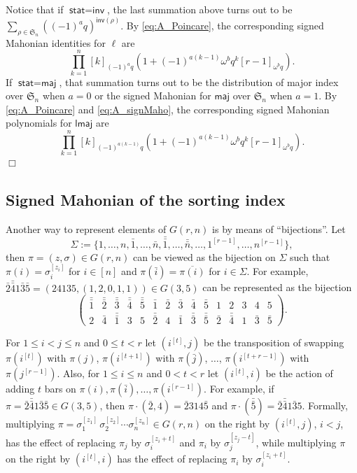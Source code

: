 \documentclass[a4paper, reqno, 11pt]{amsart}
\newcommand{\stat}{{\textsf{stat}}}
\newcommand{\maj}{{\textsf{maj}}}
\newcommand{\inv}{{\textsf{inv}}}
\newcommand{\lmaj}{{\textsf{lmaj}}}
\numberwithin{equation}{section}
\renewcommand{\d}{\displaystyle}
\def\qed{\hspace*{\fill} $\Box$ \medskip}
\begin{document}
Notice that if $\stat=\inv$, the last summation above turns out to be 
$\d\sum_{\rho\in \mathfrak{S}_n}\left((-1)^{a}q\right)^{\inv(\rho)}$. 
By \eqref{eq:A_Poincare}, the corresponding signed Mahonian identities for $\ell$ are
$$\prod_{k=1}^n[k]_{(-1)^aq}\left(1+(-1)^{a(k-1)}\omega^bq^k[r-1]_{\omega^bq}\right).$$
If $\stat=\maj$, that summation turns out to be the distribution of major index over $\mathfrak{S}_n$ when $a=0$ or the signed Mahonian for $\maj$ over $\mathfrak{S}_n$ when $a=1$. 
By \eqref{eq:A_Poincare} and \eqref{eq:A_signMaho}, the corresponding signed Mahonian polynomials for $\lmaj$ are
$$\prod_{k=1}^n[k]_{(-1)^{a(k-1)}q} \left(1+(-1)^{a(k-1)}\omega^bq^k[r-1]_{\omega^bq}\right).$$  \qed











\subsection{Signed Mahonian of the sorting index}\label{sec:Grn_sor}

Another way to represent elements of $G(r,n)$ is by means of ``bijections''.
Let $$\Sigma:=\{1,\ldots,n,\bar{1},\ldots,\bar{n},\bar{\bar{1}},\ldots,\bar{\bar{n}},\ldots,1^{[r-1]},\ldots,n^{[r-1]} \},$$ then $\pi=(z,\sigma)\in G(r,n)$ can be viewed as the bijection on $\Sigma$ such that $\pi(i)=\sigma_i^{[z_i]}$ for $i\in [n]$ and $\pi(\bar{i})=\overline{\pi(i)}$ for $i\in\Sigma$.
For example, $\bar{2}\bar{\bar{4}}1\bar{3}\bar{5}=(24135,(1,2,0,1,1))\in G(3,5)$ can be represented as the bijection
$$
\left(
\begin{array}{ccccccccccccccc}
\bar{\bar{1}} & \bar{\bar{2}} & \bar{\bar{3}} & \bar{\bar{4}} & \bar{\bar{5}} & \bar{1} & \bar{2} & \bar{3} & \bar{4} & \bar{5} & 1 & 2 & 3 & 4 & 5 \\
2 & \bar{4} & \bar{\bar{1}} & 3 & 5 & \bar{\bar{2}} & 4 & \bar{1} & \bar{\bar{3}} & \bar{\bar{5}} & \bar{2} & \bar{\bar{4}} & 1 & \bar{3} & \bar{5}
\end{array}
\right).
$$

For $1\leq i<j\leq n$ and $0\leq t<r$ let $(i^{[t]},j)$ be the transposition of swapping $\pi(i^{[t]})$ with $\pi(j)$, $\pi(i^{[t+1]})$ with $\pi(\bar{j})$, $\ldots$, $\pi(i^{[t+r-1]})$ with $\pi(j^{[r-1]})$. 
Also, for $1\leq i\leq n$ and $0<t<r$ let $(i^{[t]},i)$ be the action of adding $t$ bars on $\pi(i),\pi(\bar{i}),\ldots,\pi(i^{[r-1]})$.
For example, if $\pi=\bar{2}\bar{\bar{4}}1\bar{3}\bar{5}\in G(3,5)$, then $\pi\cdot(\bar{2},4)=\bar{2}314\bar{5}$ and $\pi\cdot(\bar{\bar{5}})=\bar{2}\bar{\bar{4}}1\bar{3}5$.
Formally, multiplying $\pi=\sigma_1^{[z_1]}\,\sigma_2^{[z_2]}\cdots\sigma_n^{[z_n]}\in G(r,n)$ on the right by $(i^{[t]},j)$, $i<j$, has the effect of replacing $\pi_j$ by $\sigma_i^{[z_i+t]}$ and $\pi_i$ by $\sigma_j^{[z_j-t]}$, while multiplying $\pi$ on the right by $(i^{[t]},i)$ has the effect of replacing $\pi_i$ by $\sigma_i^{[z_i+t]}$.
\end{document}
